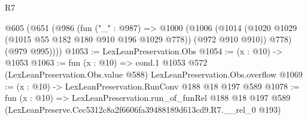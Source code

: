 \begin{lexlean}{R7}
\begin{coremodule}
  @605
    (@651
      (@986
        (fun ("_" : @987) =>
        @1000
          (@1006
            (@1014 (@1020 @1029 (@1015 @55 @182 @180 @910 @196 @1029 @778)) (@972 @910 @910))
            @778)
          (@979 @995))))
@1053 := LexLeanPreservation.Obs
@1054 := (x : @10) -> @1053
@1063 := fun (x : @10) =>
  cond.{1} @1053 @572 (LexLeanPreservation.Obs.value @588) LexLeanPreservation.Obs.overflow
@1069 := (x : @10) -> LexLeanPreservation.RunConv @188 @18 @197 @589
@1078 := fun (x : @10) =>
  LexLeanPreservation.run_of_funRel
    @188
    @18
    @197
    @589
    (LexLeanPreserve.Cec5312c8a2f6606fa39488189d613cd9.R7.__rel_0 @193)
\end{coremodule}
\end{lexlean}

